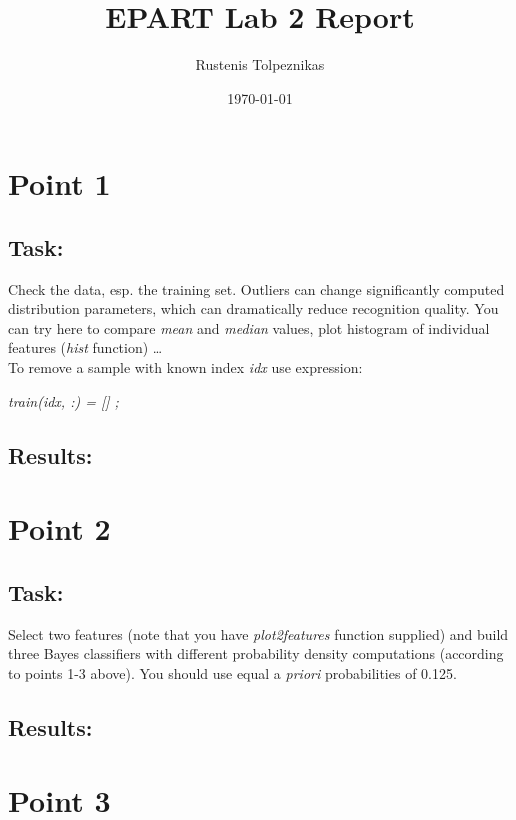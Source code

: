\documentclass[
  a4paper,            %
  DIV=10,             %
  oneside,            %
  BCOR=5mm,           %
  parskip=half,       %
  numbers=noenddot,   %
  bibtotoc,           %
  listof=totoc        %
]{scrreprt}
\title{EPART Lab 2 Report}
\author{Rustenis Tolpeznikas}
\date{\today}
\begin{document}
\maketitle
\newpage

\section*{Point 1}
\subsection*{Task:}
Check the data, esp. the training set.
Outliers can change significantly computed distribution parameters, which can dramatically reduce recognition quality.
You can try here to compare \textit{mean} and \textit{median} values, plot histogram of individual features (\textit{hist} function) …
\\
To remove a sample with known index \textit{idx} use expression:
\begin{center}
    \textit{train(idx, :) = [] ;}
\end{center}

\subsection*{Results:}



\section*{Point 2}
\subsection*{Task:}
Select two features (note that you have \textit{plot2features} function supplied) and build three Bayes classifiers with different probability density computations (according to points 1-3 above).
You should use equal a \textit{priori} probabilities of 0.125.
\subsection*{Results:}

\section*{Point 3}
\end{document}
